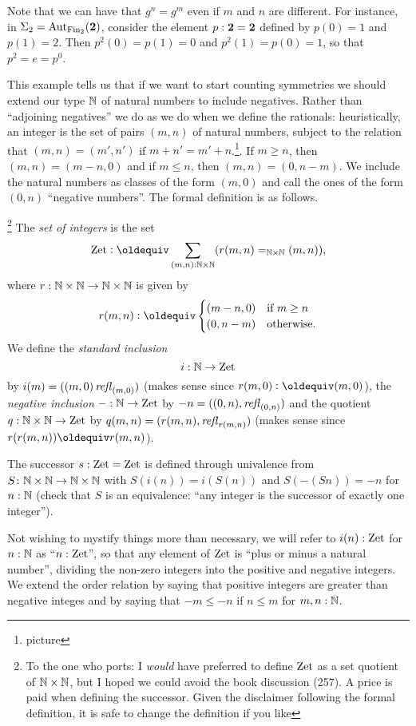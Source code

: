{{\begin{example}
Note that we can have that $g^n=g^m$ even if $m$ and $n$ are different.  For instance, in $\Sigma_2=\mathrm{Aut}_{\operatorname{Fin}_2}(\mathbf{2} )$, consider the element $p:\mathbf{2} =\mathbf{2} $ defined by $p(0)=1$ and $p(1)=2$.  Then $p^2(0)=p(1)=0$ and $p^2(1)=p(0)=1$, so that $p^2=e=p^0$.
   \end{example}
This example tells us that if we want to start counting symmetries we should extend our type $\mathbb{N}$ of natural numbers to include negatives.  Rather than ``adjoining negatives'' we do as we do when we define the rationals: heuristically, an integer is the set of pairs $(m,n)$ of natural numbers, subject to the relation that $(m,n)=(m',n')$ if $m+n'=m'+n$.\footnote{picture}.  If $m\geq n$, then $(m,n)=(m-n,0)$ and if $m\leq n$, then $(m,n)=(0,n-m)$.  We include the natural numbers as classes of the form $(m,0)$ and call the ones of the form $(0,n)$ ``negative numbers''.  The formal definition is as follows.
\begin{definition}
\footnote{To the one who ports: I \emph{would} have preferred to define $\mathrm{Zet}$ as a set quotient of $\mathbb{N}\times\mathbb{N}$, but I hoped we could avoid the book discussion (257).  A price is paid when defining the successor.  Given the disclaimer following the formal definition, it is safe to change the definition if you like}
  The \emph{set of integers} is the set
$$\zet\defequi \sum_{(m,n):\NN\times\NN}(r(m,n)=_{\NN\times\NN}(m,n)),$$
where $r:\mathbb{N}\times\mathbb{N}\to\mathbb{N}\times\mathbb{N}$ is given by
$$r(m,n)\defequi
\begin{cases}
  (m-n,0)&\text{if $m\geq n$}\\
  (0,n-m)&\text{otherwise.}
\end{cases}
$$
We define the \emph{standard inclusion} 
$$i:\mathbb{N}\to\mathrm{Zet}$$ by $i(m)=((m,0)\mathop{{\it refl}_{(m,0)}})$ (makes sense since $r(m,0)\defequi(m,0)$), the \emph{negative inclusion} $-:\mathbb{N}\to\mathrm{Zet}$ by $-n=((0,n),\mathop{{\it refl}_{(0,n)}})$ and the quotient $q:\mathbb{N}\times\mathbb{N}\to\mathrm{Zet}$ by $q(m,n)=(r(m,n),\mathop{{\it refl}_{r(m,n)}})$ (makes sense since $r(r(m,n))\oldequiv r(m,n)$).  

The successor $s:\mathrm{Zet}=\mathrm{Zet}$ is defined through univalence from $S\colon\mathbb{N}\times\mathbb{N}\to\mathbb{N}\times\mathbb{N}$ with $S(i(n))=i(S(n))$  and $S(-(Sn))=-n$ for $n:\mathbb{N}$ (check that $S$ is an equivalence: ``any integer is the successor of exactly one integer'').
\end{definition}

Not wishing to mystify things more than necessary, we will refer to $i(n):\mathrm{Zet}$ for $n:\mathbb{N}$ as ``$n:\mathrm{Zet}$'', so that any element of $\mathrm{Zet}$ is ``plus or minus a natural number'', dividing the non-zero integers into the positive and negative integers.  We extend the order relation by saying that positive integers are greater than negative integes and by saying that $-m\leq -n$ if $n\leq m$ for $m,n:\mathbb{N}$.
}%

}
